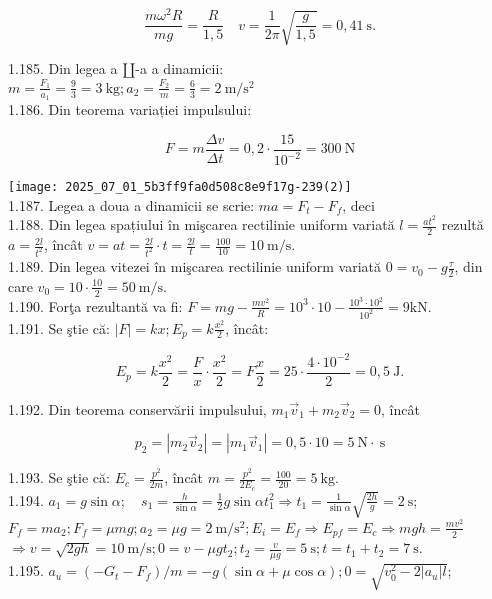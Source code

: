 $$
\frac{m \omega^{2} R}{m g}=\frac{R}{1,5} \quad v=\frac{1}{2 \pi} \sqrt{\frac{g}{1,5}}=0,41 \mathrm{~s} .
$$

1.185. Din legea a $\amalg$-a a dinamicii:\\
$m=\frac{F_{1}}{a_{1}}=\frac{9}{3}=3 \mathrm{~kg} ; a_{2}=\frac{F_{2}}{m}=\frac{6}{3}=2 \mathrm{~m} / \mathrm{s}^{2}$\\
1.186. Din teorema variației impulsului:

$$
F=m \frac{\Delta v}{\Delta t}=0,2 \cdot \frac{15}{10^{-2}}=300 \mathrm{~N}
$$

\texttt{[image: 2025\_07\_01\_5b3ff9fa0d508c8e9f17g-239(2)]}\\
1.187. Legea a doua a dinamicii se scrie: $m a=F_{t}-F_{f}$, deci\\
1.188. Din legea spațiului în mişcarea rectilinie uniform variată $l=\frac{a t^{2}}{2}$ rezultă $a=\frac{2 l}{t^{2}}$, încât $v=a t=\frac{2 l}{t^{2}} \cdot t=\frac{2 l}{t}=\frac{100}{10}=10 \mathrm{~m} / \mathrm{s}$.\\
1.189. Din legea vitezei în mişcarea rectilinie uniform variată $0=v_{0}-g \frac{\tau}{2}$, din care $v_{0}=10 \cdot \frac{10}{2}=50 \mathrm{~m} / \mathrm{s}$.\\
1.190. Forţa rezultantă va fi: $F=m g-\frac{m v^{2}}{R}=10^{3} \cdot 10-\frac{10^{3} \cdot 10^{2}}{10^{2}}=9 \mathrm{kN}$.\\
1.191. Se ştie că: $|F|=k x ; E_{p}=k \frac{x^{2}}{2}$, încât:

$$
E_{p}=k \frac{x^{2}}{2}=\frac{F}{x} \cdot \frac{x^{2}}{2}=F \frac{x}{2}=25 \cdot \frac{4 \cdot 10^{-2}}{2}=0,5 \mathrm{~J} .
$$

1.192. Din teorema conservării impulsului, $m_{1} \vec{v}_{1}+m_{2} \vec{v}_{2}=0$, încât

$$
p_{2}=\left|m_{2} \vec{v}_{2}\right|=\left|m_{1} \vec{v}_{1}\right|=0,5 \cdot 10=5 \mathrm{~N} \cdot \mathrm{~s}
$$

1.193. Se ştie că: $E_{c}=\frac{p^{2}}{2 m}$, încât $m=\frac{p^{2}}{2 E_{c}}=\frac{100}{20}=5 \mathrm{~kg}$.\\
1.194. $a_{1}=g \sin \alpha ; \quad s_{1}=\frac{h}{\sin \alpha}=\frac{1}{2} g \sin \alpha t_{1}^{2} \Rightarrow t_{1}=\frac{1}{\sin \alpha} \sqrt{\frac{2 h}{g}}=2 \mathrm{~s}$;\\
$F_{f}=m a_{2} ; F_{f}=\mu m g ; a_{2}=\mu g=2 \mathrm{~m} / \mathrm{s}^{2} ; E_{i}=E_{f} \Rightarrow E_{p f}=E_{c} \Rightarrow m g h=\frac{m v^{2}}{2}$\\
$\Rightarrow v=\sqrt{2 g h}=10 \mathrm{~m} / \mathrm{s} ; 0=v-\mu g t_{2} ; t_{2}=\frac{v}{\mu g}=5 \mathrm{~s} ; t=t_{1}+t_{2}=7 \mathrm{~s}$.\\
1.195. $a_{u}=\left(-G_{t}-F_{f}\right) / m=-g(\sin \alpha+\mu \cos \alpha) ; 0=\sqrt{v_{0}^{2}-2\left|a_{u}\right| l}$;

